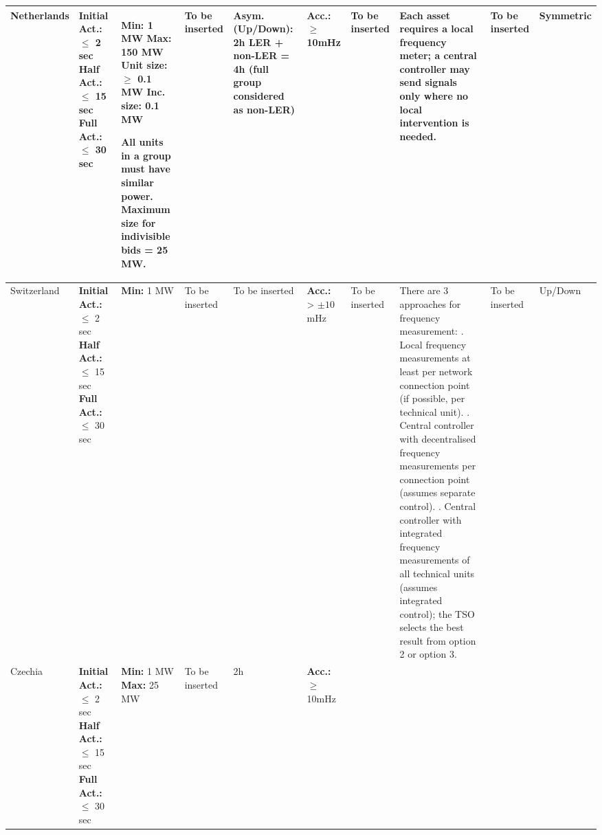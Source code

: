 \begin{landscape}
\begin{longtable}{|p{1.8cm}|p{2.2cm}|p{2.2cm}|p{2.2cm}|p{2.5cm}|p{1.5cm}|p{2.2cm}|p{4cm}|p{2.5cm}|p{2cm}|}
\hline
Netherlands 
& 
\textbf{Initial Act.:} $\leq$ 2 sec \newline
\textbf{Half Act.:} $\leq$ 15 sec \newline
\textbf{Full Act.:} $\leq$ 30 sec \newline
& 
\textbf{Min: }1 MW \newline
\textbf{Max: }150 MW \newline
\textbf{Unit size: }$\geq$ 0.1 MW \newline
\textbf{Inc. size: }0.1 MW \newline

All units in a group must have similar power.
\newline Maximum size for indivisible bids = 25 MW.
& To be inserted 
& 
\textbf{Asym. (Up/Down): } 2h
\newline
LER + non-LER = 4h (full group considered as non-LER)
& 
\textbf{Acc.: }$\geq$ 10mHz 
& 
To be inserted
&
Each asset requires a local frequency meter; a central controller may send signals only where no local intervention is needed.
& To be inserted & Symmetric \\
\hline
Switzerland 
& 
\textbf{Initial Act.:} $\leq$ 2 sec \newline
\textbf{Half Act.:} $\leq$ 15 sec \newline
\textbf{Full Act.:} $\leq$ 30 sec \newline
& 
\textbf{Min: }1 MW
& 
To be inserted 
& 
To be inserted & 
\textbf{Acc.: }> $\pm 10$mHz  
& 
To be inserted 
& 
There are 3 approaches for frequency measurement:
\newline 1. Local frequency measurements at least per network connection point (if possible, per technical unit).
\newline 2. Central controller with decentralised frequency measurements per connection point (assumes separate control).
\newline 3. Central controller with integrated frequency measurements of all technical units (assumes integrated control); the TSO selects the best result from option 2 or option 3.
& 
To be inserted &
Up/Down \\
\hline
Czechia 
& 
\textbf{Initial Act.:} $\leq$ 2 sec \newline
\textbf{Half Act.:} $\leq$ 15 sec \newline
\textbf{Full Act.:} $\leq$ 30 sec
& 
\textbf{Min: }1 MW
\newline \textbf{Max: }25 MW
& To be inserted
&
2h
& 
\textbf{Acc.: }$\geq$ 10mHz  
\vspace{0.2cm}

\end{longtable}
\end{landscape}

